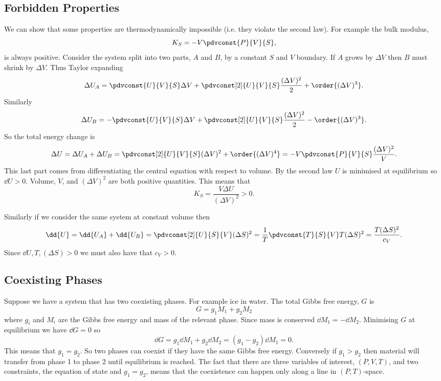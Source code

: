     \subsection{Forbidden Properties}
    We can show that some properties are thermodynamically impossible (i.e. they violate the second law).
    For example the bulk modulus,
    \[K_S = -V\pdvconst{P}{V}{S},\]
    is always positive.
    Consider the system split into two parts, \(A\) and \(B\), by a constant \(S\) and \(V\) boundary.
    If \(A\) grows by \(\Delta V\) then \(B\) must shrink by \(\Delta V\).
    Thus Taylor expanding
    \[\Delta U_A = \pdvconst{U}{V}{S}\Delta V + \pdvconst[2]{U}{V}{S}\frac{(\Delta V)^2}{2} + \order{(\Delta V)^3}.\]
    Similarly
    \[\Delta U_B = -\pdvconst{U}{V}{S}\Delta V + \pdvconst[2]{U}{V}{S}\frac{(\Delta V)^2}{2} - \order{(\Delta V)^3}.\]
    So the total energy change is
    \[\Delta U = \Delta U_A + \Delta U_B = \pdvconst[2]{U}{V}{S}(\Delta V)^2 + \order{(\Delta V)^4} = -V\pdvconst{P}{V}{S}\frac{(\Delta V)^2}{V}.\]
    This last part comes from differentiating the central equation with respect to volume.
    By the second law \(U\) is minimised at equilibrium so \(\dd{U} > 0\).
    Volume, \(V\), and \((\Delta V)^2\) are both positive quantities.
    This means that
    \[K_S = \frac{V\Delta U}{(\Delta V)^2} > 0.\]
    
    Similarly if we consider the same system at constant volume then
    \[\dd{U} = \dd{U_A} + \dd{U_B} = \pdvconst[2]{U}{S}{V}(\Delta S)^2 = \frac{1}{T}\pdvconst{T}{S}{V}T(\Delta S)^2 = \frac{T(\Delta S)^2}{c_V}.\]
    Since \(\dd{U}, T, (\Delta S) > 0\) we must also have that \(c_V > 0\).
    
    \subsection{Coexisting Phases}
    Suppose we have a system that has two coexisting phases.
    For example ice in water.
    The total Gibbs free energy, \(G\) is
    \[G = g_1M_1 + g_2M_2\]
    where \(g_i\) and \(M_i\) are the Gibbs free energy and mass of the relevant phase.
    Since mass is conserved \(\dd{M_1} = -\dd{M_2}\).
    Minimising \(G\) at equilibrium we have \(\dd{G} = 0\) so
    \[\dd{G} = g_1\dd{M_1} + g_2\dd{M_2} = (g_1 - g_2)\dd{M_1} = 0.\]
    This means that \(g_1 = g_2\).
    So two phases can coexist if they have the same Gibbs free energy.
    Conversely if \(g_1 > g_2\) then material will transfer from phase 1 to phase 2 until equilibrium is reached.
    The fact that there are three variables of interest, \((P, V, T)\), and two constraints, the equation of state and \(g_1 = g_2\), means that the coexistence can happen only along a line in \((P, T)\)-space.
    
